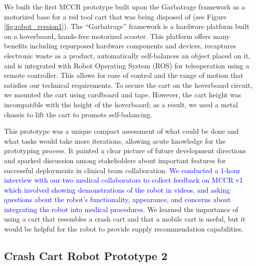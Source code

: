 We built the first MCCR prototype built upon the Garbatrage framework \cite{mandel2023recapturing} as a motorized base for a red tool cart that was being disposed of (see Figure \ref{fig:robot_version1}). 
The “Garbatrage” framework is a hardware platform built on a hoverboard, hands-free motorized scooter.
This platform offers many benefits including repurposed hardware components and devices, recaptures electronic waste as a product, automatically self-balances an object placed on it, and is integrated with Robot Operating System (ROS) for teleoperation using a remote controller.
This allows for ease of control and the range of motion that satisfies our technical requirements. 
To secure the cart on the hoverboard circuit, we mounted the cart using cardboard and tape.%
However, the cart height was incompatible with the height of the hoverboard; as a result, we used a metal chassis to lift the cart to promote self-balancing.


This prototype was a unique compact assessment of what could be done and what tasks would take more iterations, allowing acute knowledge for the prototyping process. 
It painted a clear picture of future development directions and sparked discussion among stakeholders about important features for successful deployments in clinical team collaboration. %
\textcolor{blue}{We conducted a 1-hour interview with our two medical collaborators to collect feedback on MCCR v1 which involved showing demonstrations of the robot in videos, and asking questions about the robot’s functionality, appearance, and concerns about integrating the robot into medical procedures.}
We learned the importance of using a cart that resembles a crash cart and that a mobile cart is useful, but it would be helpful for the robot to provide supply recommendation capabilities.










\subsection{Crash Cart Robot Prototype 2}

